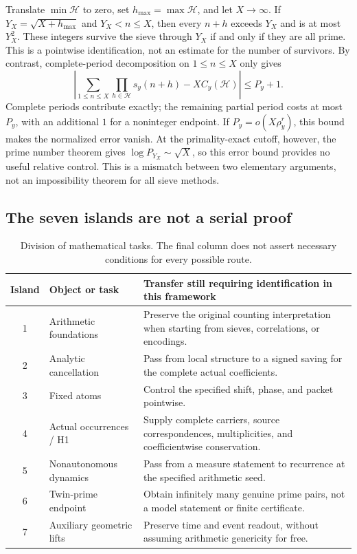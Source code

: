 Translate $\min\mathcal H$ to zero, set $h_{\max}=\max\mathcal H$, and let $X\to\infty$. If $Y_X=\sqrt{X+h_{\max}}$ and $Y_X<n\le X$, then every $n+h$ exceeds $Y_X$ and is at most $Y_X^2$. These integers survive the sieve through $Y_X$ if and only if they are all prime. This is a pointwise identification, not an estimate for the number of survivors. By contrast, complete-period decomposition on $1\le n\le X$ only gives
\[
\left|\sum_{1\le n\le X}\prod_{h\in\mathcal H}s_y(n+h)-XC_y(\mathcal H)\right|\le P_y+1.
\]
Complete periods contribute exactly; the remaining partial period costs at most $P_y$, with an additional $1$ for a noninteger endpoint. If $P_y=o(X\rho_y^r)$, this bound makes the normalized error vanish. At the primality-exact cutoff, however, the prime number theorem gives $\log P_{Y_X}\sim\sqrt X$, so this error bound provides no useful relative control. This is a mismatch between two elementary arguments, not an impossibility theorem for all sieve methods.

\subsection{The seven islands are not a serial proof}
\begin{table}[H]
\centering\small
\caption{Division of mathematical tasks. The final column does not assert necessary conditions for every possible route.}
\begin{tabularx}{\textwidth}{c p{} X}
\toprule
Island & Object or task & Transfer still requiring identification in this framework\\\midrule
1 & Arithmetic foundations & Preserve the original counting interpretation when starting from sieves, correlations, or encodings.\\
2 & Analytic cancellation & Pass from local structure to a signed saving for the complete actual coefficients.\\
3 & Fixed atoms & Control the specified shift, phase, and packet pointwise.\\
4 & Actual occurrences / H1 & Supply complete carriers, source correspondences, multiplicities, and coefficientwise conservation.\\
5 & Nonautonomous dynamics & Pass from a measure statement to recurrence at the specified arithmetic seed.\\
6 & Twin-prime endpoint & Obtain infinitely many genuine prime pairs, not a model statement or finite certificate.\\
7 & Auxiliary geometric lifts & Preserve time and event readout, without assuming arithmetic genericity for free.\\
\bottomrule
\end{tabularx}
\end{table}


